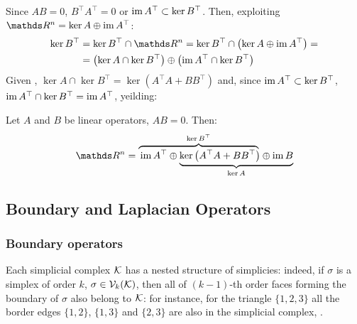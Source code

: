 Since \( A B = 0\), \( B^\top A^\top = 0 \) or \( \operatorname{im} A^\top \subset \ker B^\top \). Then, exploiting \( \ds R^n = \ker A \oplus \im A^\top \): 
\begin{equation}
      \begin{aligned}
            \ker B^\top & = \ker B^\top \cap \ds R^n = \ker B^\top \cap \left( \ker A \oplus \im A^\top \right) = \\
            & = \left( \ker A \cap \ker B^\top \right) \oplus \left( \im A^\top \cap \ker B^\top \right)
      \end{aligned}
\end{equation}
Given , \( \ker A \cap \ker B^\top = \ker \left(  A^\top A + B B^\top \right) \) and, since \( \operatorname{im} A^\top \subset \ker B^\top \), \( \operatorname{im} A^\top \cap \ker B^\top = \operatorname{im} A^\top \), yeilding:
\begin{theorem}\label{thm:hodge_decomposition}
      Let \( A \) and \( B \) be linear operators, \( A B = 0 \). Then:
      \begin{equation}
            \ds R^n = \lefteqn{\overbrace{\phantom{\im A^\top \oplus  \ker \left( A^\top A + B B^\top \right)}}^{\ker B^\top}} \im A^\top \oplus
            \underbrace{\ker \left( A^\top A + B B^\top \right) \oplus  \im B}_{\ker A}
      \end{equation}
      \vspace{-\baselineskip}
\end{theorem}





\subsection{ Boundary and Laplacian Operators }

\subsubsection{Boundary operators}

Each simplicial complex \( \mathcal{K} \) has a nested structure of simplicies: indeed, if \( \sigma \) is a simplex of order \( k \), \( \sigma \in \mathcal{V}_{k}(\mathcal{K}) \), then all of \( (k-1)\)-th order faces forming the boundary of \( \sigma \) also belong to \( \mathcal{K} \): for instance, for the triangle \( \{ 1, 2, 3  \} \) all the border edges \( \{ 1, 2\} \), \( \{ 1, 3\}\) and \( \{ 2, 3 \}\) are also in the simplicial complex, . 

